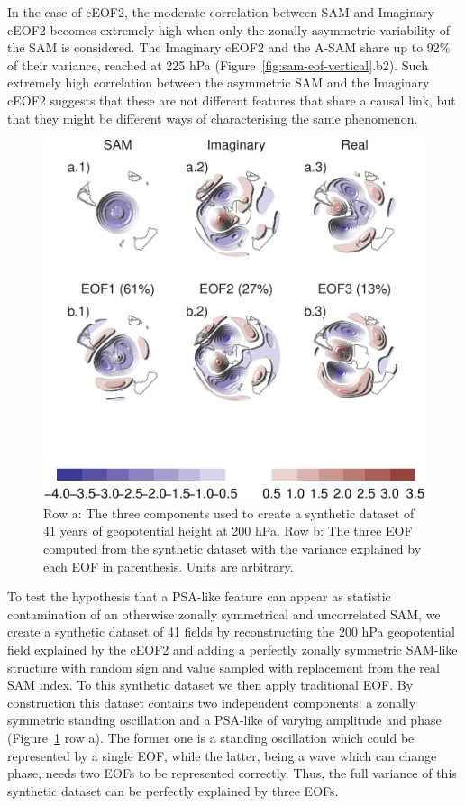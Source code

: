 \documentclass[smallextended]{svjour3}       %
\begin{document}
In the case of cEOF2, the moderate correlation between SAM and Imaginary cEOF2 becomes extremely high when only the zonally asymmetric variability of the SAM is considered. The Imaginary cEOF2 and the A-SAM share up to 92\% of their variance, reached at 225 hPa (Figure~\ref{fig:sam-eof-vertical}.b2). Such extremely high correlation between the asymmetric SAM and the Imaginary cEOF2 suggests that these are not different features that share a causal link, but that they might be different ways of characterising the same phenomenon.



\begin{figure}
\centering
\includegraphics{../figures/fake-eof-1.pdf}
\caption{\label{fig:fake-eof}Row a: The three components used to create a synthetic dataset of 41 years of geopotential height at 200 hPa. Row b: The three EOF computed from the synthetic dataset with the variance explained by each EOF in parenthesis. Units are arbitrary.}
\end{figure}

To test the hypothesis that a PSA-like feature can appear as statistic contamination of an otherwise zonally symmetrical and uncorrelated SAM, we create a synthetic dataset of 41 fields by reconstructing the 200 hPa geopotential field explained by the cEOF2 and adding a perfectly zonally symmetric SAM-like structure with random sign and value sampled with replacement from the real SAM index. To this synthetic dataset we then apply traditional EOF. By construction this dataset contains two independent components: a zonally symmetric standing oscillation and a PSA-like of varying amplitude and phase (Figure~\ref{fig:fake-eof} row a). The former one is a standing oscillation which could be represented by a single EOF, while the latter, being a wave which can change phase, needs two EOFs to be represented correctly. Thus, the full variance of this synthetic dataset can be perfectly explained by three EOFs.
\end{document}
